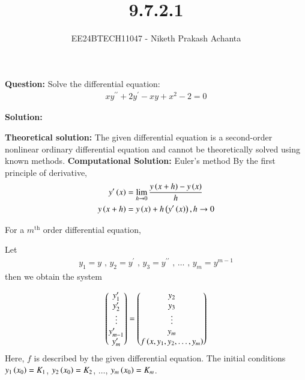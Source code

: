 \documentclass[journal]{IEEEtran}
\begin{document}

\vspace{3cm}

\title{9.7.2.1}
\author{EE24BTECH11047 - Niketh Prakash Achanta}
{\let\newpage\relax\maketitle}

\renewcommand{\thefigure}{\theenumi}
\renewcommand{\thetable}{\theenumi}
\setlength{\intextsep}{10pt} %

\textbf{Question:}
\newline
Solve the differential equation:
\begin{align}
	x y^{\prime\prime} + 2y^{\prime} - x y + x^2 - 2 = 0
\end{align}

\textbf{Solution:}

\textbf{Theoretical solution:}
\newline
The given differential equation is a second-order nonlinear ordinary differential equation and cannot be theoretically solved using known methods.
\newline
\textbf{Computational Solution:} Euler's method
\newline
By the first principle of derivative,
\begin{align}
    y^{\prime}\left(x\right) &= \lim_{h\to0} \frac{y\left(x + h\right) - y\left(x\right)}{h}\\
    y\left(x + h\right) &= y\left(x\right) + h\left(y^{\prime}\left(x\right)\right), h\to0
\end{align}

For a $m^{\text{th}}$ order differential equation,
\newline

Let 
\begin{align}
    y_1 = y \text{ , } y_2 = y^{\prime} \text{ , } y_3 = y^{\prime\prime} \text{ , } \dots \text{ , } y_m = y^{m - 1}
\end{align}
then we obtain the system

\begin{align}
    \begin{pmatrix}y_1^{\prime}\\y_2^{\prime}\\\vdots\\y_{m - 1}^{\prime}\\y_m^{\prime}\end{pmatrix} = \begin{pmatrix}y_2\\y_3\\\vdots\\y_m\\f\left(x, y_1, y_2,\dots,y_m\right)\end{pmatrix}
\end{align}
Here, $f$ is described by the given differential equation. The initial conditions $y_1\left(x_0\right) = K_1$, $y_2\left(x_0\right) = K_2$, $\dots$, $y_m\left(x_0\right) = K_m$.
\end{document}
